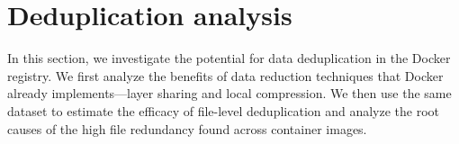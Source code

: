 \section{Deduplication analysis}
\label{sec:redundant_files}

In this section, we investigate the potential for data deduplication in the
Docker registry.
%
We first analyze the benefits of data reduction
techniques that Docker already implements---layer sharing and local
compression.
%
%
%
%
%
%
We then use the same dataset to estimate the efficacy of file-level
deduplication and analyze the root causes of the high file redundancy found
across container images.
%




